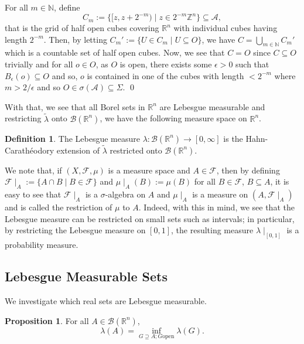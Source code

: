 \documentclass[
]{article}
\theoremstyle{definition}
\newtheorem{prop}{Proposition}
\theoremstyle{definition}
\newtheorem{definition}{Definition}[section]
\begin{document}
For all \(m \in \mathbb{N}\), define
\[C_m := \{[z, z + 2^{-m}) \mid z \in 2^{-m}\mathbb{Z}^n\} \subseteq \mathcal{A},\]
that is the grid of half open cubes covering \(\mathbb{R}^n\) with
individual cubes having length \(2^{-m}\). Then, by letting
\(C_m' := \{U \in C_m \mid U \subseteq O\}\), we have
\(C = \bigcup_{m \in \mathbb{N}} C_m'\) which is a countable set of half
open cubes. Now, we see that \(C = O\) since \(C \subseteq O\) trivially
and for all \(o \in O\), as \(O\) is open, there exists some
\(\epsilon > 0\) such that \(B_\epsilon(o) \subseteq O\) and so, \(o\)
is contained in one of the cubes with length \(< 2^{-m}\) where
\(m > 2 / \epsilon\) and so
\(O \in \sigma(\mathcal{A}) \subseteq \Sigma\). \qed

With that, we see that all Borel sets in \(\mathbb{R}^n\) are Lebesgue
measurable and restricting \(\tilde\lambda\) onto
\(\mathcal{B}(\mathbb{R}^n)\), we have the following measure space on
\(\mathbb{R}^n\).

\begin{definition}
  The Lebesgue measure \(\lambda : \mathcal{B}(\mathbb{R}^n) \to [0, \infty]\) is 
  the Hahn-Carathéodory extension of \(\tilde\lambda\) restricted onto 
  \(\mathcal{B}(\mathbb{R}^n)\).
\end{definition}

We note that, if \((X, \mathcal{F}, \mu)\) is a measure space and
\(A \in \mathcal{F}\), then by defining
\(\mathcal{F}\mid_A := \{A \cap B \mid B \in \mathcal{F}\}\) and
\(\mu\mid_A(B) := \mu(B)\) for all \(B \in \mathcal{F}\),
\(B \subseteq A\), it is easy to see that \(\mathcal{F}\mid_A\) is a
\(\sigma\)-algebra on \(A\) and \(\mu\mid_A\) is a measure on
\((A, \mathcal{F}\mid_A)\) and is called the restriction of \(\mu\) to
\(A\). Indeed, with this in mind, we see that the Lebesgue measure can
be restricted on small sets such as intervals; in particular, by
restricting the Lebesgue measure on \([0, 1]\), the resulting measure
\(\lambda\mid_{[0, 1]}\) is a probability measure.

\hypertarget{lebesgue-measurable-sets}{%
\subsection{Lebesgue Measurable Sets}\label{lebesgue-measurable-sets}}

We investigate which real sets are Lebesgue measurable.

\begin{prop}
  For all \(A \in \mathcal{B}(\mathbb{R}^n)\), 
  \[\lambda(A) = \inf_{G \supseteq A; G \text{open}} \lambda(G).\]
\end{prop}
\proof
\end{document}
